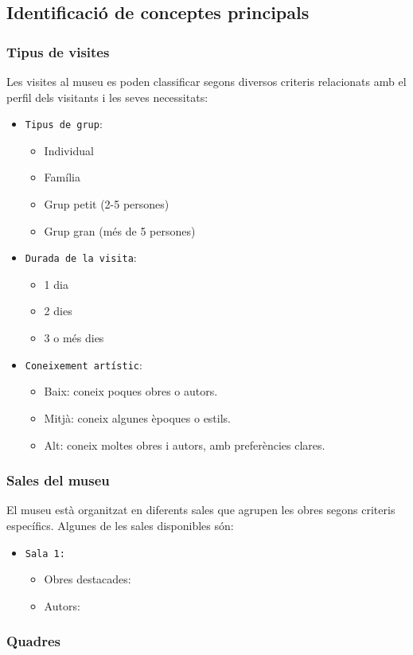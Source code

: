 \documentclass[a4paper]{article}
\begin{document}
	
	\subsection{Identificació de conceptes principals}
	
	\subsubsection{Tipus de visites}
	Les visites al museu es poden classificar segons diversos criteris relacionats amb el perfil dels visitants i les seves necessitats:
	\begin{itemize}
		\item \texttt{Tipus de grup}:
		\begin{itemize}
			\item Individual
			\item Família
			\item Grup petit (2-5 persones)
			\item Grup gran (més de 5 persones)
		\end{itemize}
		\item \texttt{Durada de la visita}:
		\begin{itemize}
			\item 1 dia
			\item 2 dies
			\item 3 o més dies
		\end{itemize}
		\item \texttt{Coneixement artístic}:
		\begin{itemize}
			\item Baix: coneix poques obres o autors.
			\item Mitjà: coneix algunes èpoques o estils.
			\item Alt: coneix moltes obres i autors, amb preferències clares.
		\end{itemize}
	\end{itemize}
	
	\subsubsection{Sales del museu}
	El museu està organitzat en diferents sales que agrupen les obres segons criteris específics. Algunes de les sales disponibles són:
	\begin{itemize}
		\item \texttt{Sala 1: } 
		\begin{itemize}
			\item Obres destacades:
			\item Autors:
		\end{itemize}
	\end{itemize}
	
	\subsubsection{Quadres}
	
\end{document}
